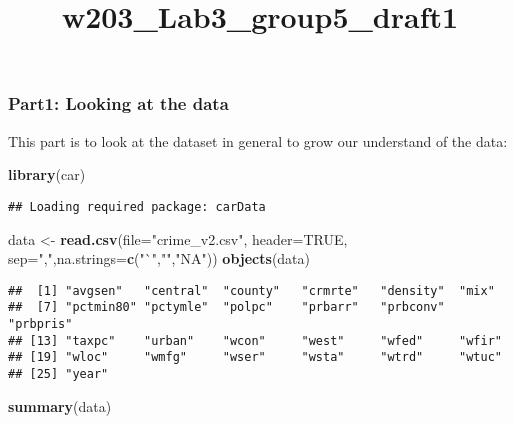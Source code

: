 \documentclass[]{article}
\title{w203\_Lab3\_group5\_draft1}
\author{}
\date{}
\newenvironment{Shaded}{\begin{snugshade}}{\end{snugshade}}
\newcommand{\KeywordTok}[1]{\textcolor[rgb]{0.13,0.29,0.53}{\textbf{#1}}}
\newcommand{\DataTypeTok}[1]{\textcolor[rgb]{0.13,0.29,0.53}{#1}}
\newcommand{\StringTok}[1]{\textcolor[rgb]{0.31,0.60,0.02}{#1}}
\newcommand{\OtherTok}[1]{\textcolor[rgb]{0.56,0.35,0.01}{#1}}
\newcommand{\NormalTok}[1]{#1}
\begin{document}
\maketitle

\subsubsection{Part1: Looking at the
data}\label{part1-looking-at-the-data}

This part is to look at the dataset in general to grow our understand of
the data:

\begin{Shaded}
\begin{Highlighting}[]
\KeywordTok{library}\NormalTok{(car)}
\end{Highlighting}
\end{Shaded}

\begin{verbatim}
## Loading required package: carData
\end{verbatim}

\begin{Shaded}
\begin{Highlighting}[]
\NormalTok{data <-}\StringTok{ }\KeywordTok{read.csv}\NormalTok{(}\DataTypeTok{file=}\StringTok{"crime_v2.csv"}\NormalTok{, }\DataTypeTok{header=}\OtherTok{TRUE}\NormalTok{, }\DataTypeTok{sep=}\StringTok{","}\NormalTok{,}\DataTypeTok{na.strings=}\KeywordTok{c}\NormalTok{(}\StringTok{"`"}\NormalTok{,}\StringTok{""}\NormalTok{,}\StringTok{"NA"}\NormalTok{))}
\KeywordTok{objects}\NormalTok{(data)}
\end{Highlighting}
\end{Shaded}

\begin{verbatim}
##  [1] "avgsen"   "central"  "county"   "crmrte"   "density"  "mix"     
##  [7] "pctmin80" "pctymle"  "polpc"    "prbarr"   "prbconv"  "prbpris" 
## [13] "taxpc"    "urban"    "wcon"     "west"     "wfed"     "wfir"    
## [19] "wloc"     "wmfg"     "wser"     "wsta"     "wtrd"     "wtuc"    
## [25] "year"
\end{verbatim}

\begin{Shaded}
\begin{Highlighting}[]
\KeywordTok{summary}\NormalTok{(data)}
\end{Highlighting}
\end{Shaded}
\end{document}
